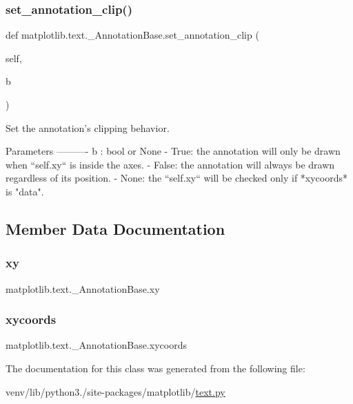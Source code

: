 \subsubsection{\texorpdfstring{set\+\_\+annotation\+\_\+clip()}{set\_annotation\_clip()}}
{\footnotesize\ttfamily def matplotlib.\+text.\+\_\+\+Annotation\+Base.\+set\+\_\+annotation\+\_\+clip (\begin{DoxyParamCaption}\item[{}]{self,  }\item[{}]{b }\end{DoxyParamCaption})}

\begin{DoxyVerb}Set the annotation's clipping behavior.

Parameters
----------
b : bool or None
    - True: the annotation will only be drawn when ``self.xy`` is
      inside the axes.
    - False: the annotation will always be drawn regardless of its
      position.
    - None: the ``self.xy`` will be checked only if *xycoords* is
      "data".
\end{DoxyVerb}
 

\subsection{Member Data Documentation}
\mbox{\label{classmatplotlib_1_1text_1_1__AnnotationBase_ac9c32848102bb1318fba1c9497534435}} 
\subsubsection{\texorpdfstring{xy}{xy}}
{\footnotesize\ttfamily matplotlib.\+text.\+\_\+\+Annotation\+Base.\+xy}

\mbox{\label{classmatplotlib_1_1text_1_1__AnnotationBase_aadf45788135e13bec1ebe497a5f95274}} 
\subsubsection{\texorpdfstring{xycoords}{xycoords}}
{\footnotesize\ttfamily matplotlib.\+text.\+\_\+\+Annotation\+Base.\+xycoords}



The documentation for this class was generated from the following file\+:\begin{DoxyCompactItemize}
\item 
venv/lib/python3./site-\/packages/matplotlib/\hyperlink{matplotlib_2text_8py}{text.\+py}\end{DoxyCompactItemize}
